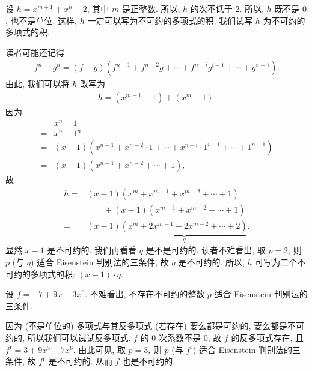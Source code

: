 \begin{example}
    设 $h = x^{m+1} + x^n - 2$, 其中 $m$ 是正整数. 所以, $h$ 的次不低于 $2$. 所以, $h$ 既不是 $0$, 也不是单位. 这样, $h$ 一定可以写为不可约的多项式的积. 我们试写 $h$ 为不可约的多项式的积.

    读者可能还记得
    \begin{align*}
        f^n - g^n = (f - g)(f^{n-1} + f^{n-2} g + \cdots + f^{n-i} g^{i-1} + \cdots + g^{n-1}).
    \end{align*}
    由此, 我们可以将 $h$ 改写为
    \begin{align*}
        h = (x^{m+1} - 1) + (x^m - 1).
    \end{align*}
    因为
    \begin{align*}
             & x^n - 1                                                                                \\
        = {} & x^n - 1^n                                                                              \\
        = {} & (x - 1)(x^{n-1} + x^{n-2} \cdot 1 + \cdots + x^{n-i} \cdot 1^{i-1} + \cdots + 1^{n-1}) \\
        = {} & (x - 1)(x^{n-1} + x^{n-2} + \cdots + 1),
    \end{align*}
    故
    \begin{align*}
        h
        = {} & (x - 1)(x^m + x^{m-1} + x^{m-2} + \cdots + 1)                     \\
             & \qquad + (x - 1)(x^{m-1} + x^{m-2} + \cdots + 1)                  \\
        = {} & (x - 1)\underbrace{(x^m + 2x^{m-1} + 2x^{m-2} + \cdots + 2)}_{q}.
    \end{align*}
    显然 $x-1$ 是不可约的. 我们再看看 $q$ 是不是可约的. 读者不难看出, 取 $p = 2$, 则 $p$ (与 $q$) 适合 Eisenstein 判别法的三条件, 故 $q$ 是不可约的. 所以, $h$ 可写为二个不可约的多项式的积: $(x - 1) \cdot q$.
\end{example}

\begin{example}
    设 $f = -7 + 9x + 3x^6$. 不难看出, 不存在不可约的整数 $p$ 适合 Eisenstein 判别法的三条件.

    因为 (不是单位的) 多项式与其反多项式 (若存在) 要么都是可约的, 要么都是不可约的, 所以我们可以试试反多项式. $f$ 的 $0$ 次系数不是 $0$, 故 $f$ 的反多项式存在, 且 $f^{\mathrm{r}} = 3 + 9x^5 - 7x^6$. 由此可见, 取 $p = 3$, 则 $p$ (与 $f^{\mathrm{r}}$) 适合 Eisenstein 判别法的三条件, 故 $f^{\mathrm{r}}$ 是不可约的. 从而 $f$ 也是不可约的.
\end{example}

